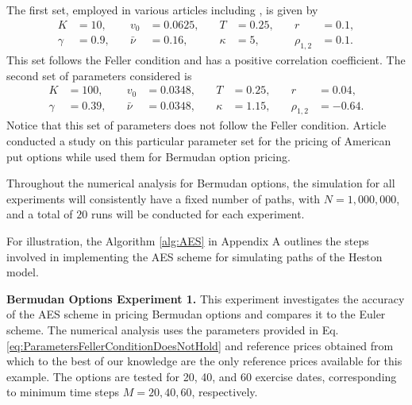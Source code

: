 \documentclass[]{interact}
\theoremstyle{plain}%
\theoremstyle{definition}
\theoremstyle{remark}
\begin{document}
 The first set, employed in various articles including \cite{clarke1996multigrid,haentjens2015adi,ikonen2009operator,oosterlee2003multigrid,persson2010pricing,vellekoop2009tree,zvan1998penalty}, is given by
\begin{equation}
\begin{aligned}
K &= 10, &\quad v_0 &= 0.0625, &\quad T &= 0.25, &\quad r &= 0.1, \\
\gamma &= 0.9, &\quad \bar{\nu} &= 0.16, &\quad \kappa &= 5, &\quad \rho_{1,2} &= 0.1.
\end{aligned}
\label{eq:ParametersFellerConditionHolds}
\end{equation}
This set follows the Feller condition and has a positive correlation coefficient. The second set of parameters considered is
\begin{equation}
\begin{aligned}
K &= 100, &\quad v_0 &= 0.0348, &\quad T &= 0.25, &\quad r &= 0.04, \\
\gamma &= 0.39, &\quad \bar{\nu} &= 0.0348, &\quad \kappa &= 1.15, &\quad \rho_{1,2} &= -0.64.
\end{aligned}
\label{eq:ParametersFellerConditionDoesNotHold}
\end{equation}
Notice that this set of parameters does not follow the Feller condition. Article \cite{haentjens2015adi} conducted a study on this particular parameter set for the pricing of American put options while \cite{fang2011fourier} used them for Bermudan option pricing.


Throughout the numerical analysis for Bermudan options, the simulation for all experiments will consistently have a fixed number of paths, with $N = 1,000,000$, and a total of $20$ runs will be conducted for each experiment.

For illustration, the Algorithm \ref{alg:AES} in Appendix A outlines the steps involved in implementing the AES scheme for simulating paths of the Heston model. 



\textbf{Bermudan Options Experiment 1.} This experiment investigates the accuracy of the AES scheme in pricing Bermudan options and compares it to the Euler scheme. The numerical analysis uses the parameters provided in Eq. \eqref{eq:ParametersFellerConditionDoesNotHold} and reference prices obtained from \cite{fang2011fourier} which to the best of our knowledge are the only reference prices available for this example. The options are tested for 20, 40, and 60 exercise dates, corresponding to minimum time steps \( M = 20, 40, 60 \), respectively.
\end{document}
